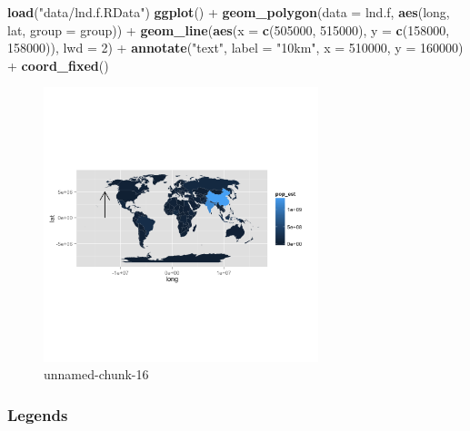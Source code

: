 \documentclass[]{article}
\newenvironment{Shaded}{}{}
\newcommand{\KeywordTok}[1]{\textcolor[rgb]{0.00,0.44,0.13}{\textbf{{#1}}}}
\newcommand{\DataTypeTok}[1]{\textcolor[rgb]{0.56,0.13,0.00}{{#1}}}
\newcommand{\DecValTok}[1]{\textcolor[rgb]{0.25,0.63,0.44}{{#1}}}
\newcommand{\StringTok}[1]{\textcolor[rgb]{0.25,0.44,0.63}{{#1}}}
\newcommand{\NormalTok}[1]{{#1}}
\let\Oldincludegraphics\includegraphics
\renewcommand{\includegraphics}[1]{\Oldincludegraphics[width=8cm]{#1}}
\begin{document}
\begin{Shaded}
\begin{Highlighting}[]
\KeywordTok{load}\NormalTok{(}\StringTok{"data/lnd.f.RData"}\NormalTok{)}
\KeywordTok{ggplot}\NormalTok{() + }\KeywordTok{geom_polygon}\NormalTok{(}\DataTypeTok{data =} \NormalTok{lnd.f, }\KeywordTok{aes}\NormalTok{(long, lat, }\DataTypeTok{group =} \NormalTok{group)) + }\KeywordTok{geom_line}\NormalTok{(}\KeywordTok{aes}\NormalTok{(}\DataTypeTok{x =} \KeywordTok{c}\NormalTok{(}\DecValTok{505000}\NormalTok{, }
    \DecValTok{515000}\NormalTok{), }\DataTypeTok{y =} \KeywordTok{c}\NormalTok{(}\DecValTok{158000}\NormalTok{, }\DecValTok{158000}\NormalTok{)), }\DataTypeTok{lwd =} \DecValTok{2}\NormalTok{) + }\KeywordTok{annotate}\NormalTok{(}\StringTok{"text"}\NormalTok{, }\DataTypeTok{label =} \StringTok{"10km"}\NormalTok{, }
    \DataTypeTok{x =} \DecValTok{510000}\NormalTok{, }\DataTypeTok{y =} \DecValTok{160000}\NormalTok{) + }\KeywordTok{coord_fixed}\NormalTok{()}
\end{Highlighting}
\end{Shaded}
\begin{figure}[htbp]
\centering
\includegraphics{figure/unnamed-chunk-16.png}
\caption{unnamed-chunk-16}
\end{figure}

\subsubsection{Legends}
\end{document}

